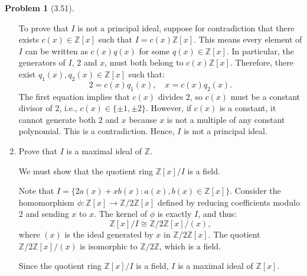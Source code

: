\documentclass[12pt]{article}
\theoremstyle{definition}
\newtheorem{problem}{Problem}
\begin{document}
\begin{problem}[3.51]
\begin{enumerate}[label=(\alph*)]
        \begin{solution}
            To prove that $I$ is not a principal ideal, suppose for contradiction that there exists $c(x) \in \mathbb{Z}[x]$ such that $I = c(x)\mathbb{Z}[x]$. This means every element of $I$ can be written as $c(x)q(x)$ for some $q(x) \in \mathbb{Z}[x]$. In particular, the generators of $I$, $2$ and $x$, must both belong to $c(x)\mathbb{Z}[x]$. Therefore, there exist $q_1(x), q_2(x) \in \mathbb{Z}[x]$ such that:
            \[
            2 = c(x)q_1(x), \quad x = c(x)q_2(x).
            \]
            The first equation implies that $c(x)$ divides $2$, so $c(x)$ must be a constant divisor of $2$, i.e., $c(x) \in \{\pm 1, \pm 2\}$. However, if $c(x)$ is a constant, it cannot generate both $2$ and $x$ because $x$ is not a multiple of any constant polynomial. This is a contradiction. Hence, $I$ is not a principal ideal.
        \end{solution}
        \item Prove that $I$ is a maximal ideal of $\mathbb{Z}$.
        
        \begin{solution}
            We must show that the quotient ring $\mathbb{Z}[x]/I$ is a field. 

            Note that $I = \{2a(x) + xb(x) : a(x), b(x) \in \mathbb{Z}[x]\}$. Consider the homomorphism $\phi : \mathbb{Z}[x] \to \mathbb{Z}/2\mathbb{Z}[x]$ defined by reducing coefficients modulo $2$ and sending $x$ to $x$. The kernel of $\phi$ is exactly $I$, and thus:
            \[
            \mathbb{Z}[x]/I \cong \mathbb{Z}/2\mathbb{Z}[x]/(x),
            \]
            where $(x)$ is the ideal generated by $x$ in $\mathbb{Z}/2\mathbb{Z}[x]$. The quotient $\mathbb{Z}/2\mathbb{Z}[x]/(x)$ is isomorphic to $\mathbb{Z}/2\mathbb{Z}$, which is a field. 

            Since the quotient ring $\mathbb{Z}[x]/I$ is a field, $I$ is a maximal ideal of $\mathbb{Z}[x]$.

        \end{solution}

    \end{enumerate}
\end{problem}
\end{document}
